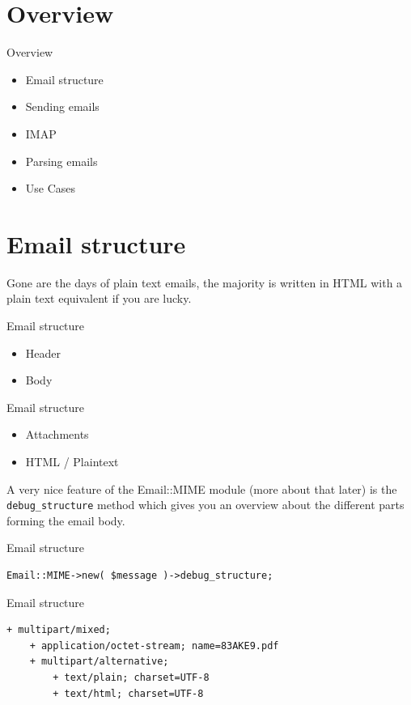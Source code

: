 \section{Overview}

\begin{frame}{Overview}
  \begin{itemize}
  \item Email structure
  \item Sending emails
  \item IMAP
  \item Parsing emails
  \item Use Cases  
  \end{itemize}
\end{frame}

\section{Email structure}

Gone are the days of plain text emails, the majority is written in HTML with
a plain text equivalent if you are lucky.

\begin{frame}{Email structure}
  \begin{itemize}
  \item Header
  \item Body
  \end{itemize}
\end{frame}

\begin{frame}{Email structure}
  \begin{itemize}
  \item Attachments
  \item HTML / Plaintext
  \end{itemize}
\end{frame}

A very nice feature of the Email::MIME module (more about that later)
is the \verb|debug_structure| method which gives you an overview about the
different parts forming the email body.

\begin{frame}[fragile]{Email structure}
\begin{verbatim}
Email::MIME->new( $message )->debug_structure;
\end{verbatim}
\end{frame}

\begin{frame}[fragile]{Email structure}
\begin{lstlisting}
+ multipart/mixed;
    + application/octet-stream; name=83AKE9.pdf
    + multipart/alternative;
        + text/plain; charset=UTF-8
        + text/html; charset=UTF-8
\end{lstlisting}
\end{frame}

